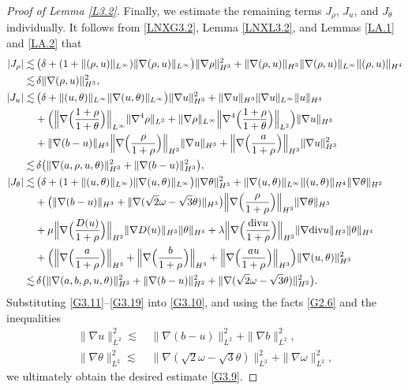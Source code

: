 \documentclass[reqno,11pt]{amsart}
\theoremstyle{plain}
\numberwithin{equation}{section}
\begin{document}
\begin{proof}[Proof of Lemma \ref{L3.2}]
Finally, we estimate the remaining terms $J_{\rho}$, $J_u$, and $J_{\theta}$ individually. It follows from \eqref{LNXG3.2}, Lemma \ref{LNXL3.2}, and Lemmas \ref{LA.1} and \ref{LA.2} that 
\begin{align}\label{G3.17}
|J_{\rho}|\lesssim&\,  \big( \delta+(1+\|(\rho,u)\|_{L^\infty})\|\nabla (\rho,u)\|_{L^\infty} \big)  \|\nabla\rho\|_{H^3}^2 + \|\nabla(\rho,u)\|_{H^3}\|\nabla(\rho,u)\|_{L^\infty}\|(\rho,u)\|_{H^4}\nonumber\\
\lesssim&\, \delta \|\nabla(\rho,u)\|_{H^3}^2,\\ \label{G3.18}
|J_u|\lesssim&\,\big( \delta+\|(u,\theta)\|_{L^\infty}\|\nabla ( u,\theta)\|_{L^\infty} \big)  \|\nabla u\|_{H^3}^2+\|\nabla u\|_{H^3}\|\nabla  u\|_{L^\infty}\|u\|_{H^4}\nonumber\\
&+\Big(\Big\|\nabla\Big(\frac{1+\rho}{1+\theta}\Big)\Big\|_{L^\infty} \|\nabla^4\rho\|_{L^2}+\|\nabla\rho\|_{L^\infty} \Big\|\nabla^4\Big(\frac{1+\rho}{1+\theta}\Big) \Big\|_{L^2} \Big)\|\nabla u\|_{H^3} \nonumber\\
&+\|\nabla(b-u)\|_{H^3}\Big\|\nabla\Big(  \frac{\rho}{1+\rho} \Big)\Big\|_{H^3}\|\nabla u\|_{H^3}+\Big\|\nabla\Big(  \frac{a}{1+\rho} \Big)\Big\|_{H^3}\|\nabla u\|_{H^3}^2 \nonumber\\
\lesssim&\, \delta \big(\|\nabla (a,\rho,u,\theta)\|_{H^3}^2+\|\nabla(b-u)\|_{H^3}^2\big),\\ \label{G3.19}
|J_{\theta}|\lesssim&\,    \big( \delta+(1+\|( u,\theta)\|_{L^\infty})\|\nabla ( u,\theta)\|_{L^\infty} \big)  \|\nabla \theta\|_{H^3}^2+\|\nabla(u,\theta)\|_{L^\infty}\|(u,\theta)\|_{H^4}\|\nabla\theta\|_{H^3} \nonumber\\
&+\big(\|\nabla(b-u)\|_{H^3}+\|\nabla(\sqrt{2}\omega-\sqrt{3}\theta)\|_{H^3} \big)
\Big\|\nabla\Big(  \frac{\rho}{1+\rho} \Big)\Big\|_{H^3} \|\nabla\theta\|_{H^3} \nonumber\\
&+\mu\Big\|\nabla\Big( \frac{D(u)}{1+\rho} \Big)\Big\|_{H^3} \|\nabla D(u)\|_{H^3} \|\theta\|_{H^4}+\lambda \Big\|\nabla\Big( \frac{{\rm div} u}{1+\rho} \Big)\Big\|_{H^3} \|\nabla {\rm div} u\|_{H^3} \|\theta\|_{H^4}\nonumber\\
&+\Big(\Big\|\nabla\Big( \frac{a}{1+\rho} \Big) \Big\|_{H^3}+\Big\|\nabla\Big( \frac{b}{1+\rho} \Big) \Big\|_{H^3}+\Big\|\nabla\Big( \frac{au}{1+\rho} \Big) \Big\|_{H^3}\Big)\|\nabla(u,\theta)\|_{H^3}^2 \nonumber\\
\lesssim&\, \delta   \big(\|\nabla (a,b,\rho,u,\theta)\|_{H^3}^2+\|\nabla(b-u)\|_{H^3}^2+\|\nabla(\sqrt{2}\omega-\sqrt{3}\theta)\|_{H^3}^2\big).
\end{align} 
Substituting \eqref{G3.11}--\eqref{G3.19}  into \eqref{G3.10}, and using 
the facts  \eqref{G2.6} and the inequalities
\begin{align*}
  \|\nabla u\|_{L^2}^2\lesssim&\,\|\nabla( b-u)\|_{L^2}^2+\|\nabla b\|_{L^2}^2,  \\
    \|\nabla \theta\|_{L^2}^2\lesssim&\,\|\nabla(\sqrt{2}\omega-\sqrt{3}\theta)\|_{L^2}^2+\|\nabla \omega\|_{L^2}^2, 
\end{align*}
we ultimately obtain the desired estimate \eqref{G3.9}. 
\end{proof}
\end{document}
